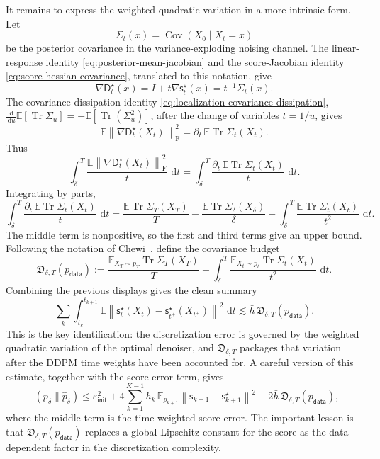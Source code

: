 \documentclass[10pt,a4paper]{amsart}
\numberwithin{equation}{section}
\DeclareMathOperator{\KL}{D_{\mathsf{KL}}}
\DeclareMathOperator{\Cov}{Cov}
\DeclareMathOperator{\Tr}{Tr}
\newcommand{\E}{\mathbb{E}}
\newcommand{\dd}{\,\mathrm{d}}
\newcommand{\Id}{I}
\newcommand{\wh}[1]{\widehat{#1}}
\newcommand{\norm}[1]{\left\lVert #1 \right\rVert}
\newcommand{\pdata}{p_{\mathsf{data}}}
\newcommand{\sstar}{\mathsf{s}^{\star}}
\newcommand{\score}{\mathsf{s}}
\newcommand{\dstar}{\mathsf{D}^{\star}}
\newcommand{\epsinit}{\varepsilon_{\mathsf{init}}}
\begin{document}
It remains to express the weighted quadratic variation in a more intrinsic
form.  Let
\[
    \Sigma_t(x)=\Cov(X_0\mid X_t=x)
\]
be the posterior covariance in the variance-exploding noising channel.  The
linear-response identity \eqref{eq:posterior-mean-jacobian} and the
score-Jacobian identity \eqref{eq:score-hessian-covariance}, translated to this
notation, give
\[
    \nabla \dstar_t(x)
    =
    \Id+t\nabla\sstar_t(x)
    =
    t^{-1}\Sigma_t(x).
\]
The covariance-dissipation identity
\eqref{eq:localization-covariance-dissipation},
$\frac{\dd}{\dd u}\E[\Tr\Sigma_u] = -\E[\Tr(\Sigma_u^2)]$, after the change of
variables $t=1/u$, gives
\[
    \E\norm{\nabla \dstar_t(X_t)}_{\mathrm F}^2
    =
    \partial_t\,\E\Tr\Sigma_t(X_t).
\]
Thus
\[
    \int_\delta^T
    \frac{\E\norm{\nabla \dstar_t(X_t)}_{\mathrm F}^2}{t}
    \,\dd t
    =
    \int_\delta^T
    \frac{\partial_t\,\E\Tr\Sigma_t(X_t)}{t}\,\dd t.
\]
Integrating by parts,
\[
    \int_\delta^T
    \frac{\partial_t\,\E\Tr\Sigma_t(X_t)}{t}\,\dd t
    =
    \frac{\E\Tr\Sigma_T(X_T)}{T}
    -
    \frac{\E\Tr\Sigma_\delta(X_\delta)}{\delta}
    +
    \int_\delta^T
    \frac{\E\Tr\Sigma_t(X_t)}{t^2}\,\dd t.
\]
The middle term is nonpositive, so the first and third terms give an upper
bound.  Following the notation of
Chewi~\cite[Chapter~12]{chewi2024logconcave}, define the covariance budget
\begin{equation}\label{eq:D-delta-T}
    \mathfrak D_{\delta,T}(\pdata)
    :=
    \frac{\E_{X_T\sim p_T}\Tr\Sigma_T(X_T)}{T}
    +
    \int_\delta^T
    \frac{\E_{X_t\sim p_t}\Tr\Sigma_t(X_t)}{t^2}\,\dd t.
\end{equation}
Combining the previous displays gives the clean summary
\[
    \sum_k
    \int_{t_k}^{t_{k+1}}
    \E\norm{
        \sstar_t(X_t)-\sstar_{t^+}(X_{t^+})
    }^2\,\dd t
    \lesssim
    \bar h\,\mathfrak D_{\delta,T}(\pdata).
\]
This is the key identification: the discretization error is governed by the
weighted quadratic variation of the optimal denoiser, and
$\mathfrak D_{\delta,T}$ packages that variation after the DDPM time weights
have been accounted for.  A careful version of this estimate, together with the
score-error term, gives
\begin{equation}\label{eq:chewi-ddpm-D}
    \KL(p_\delta\|\wh p_\delta)
    \leq
    \epsinit^2
    +
    4\sum_{k=1}^{K-1} h_k\,
    \E_{p_{k+1}}
    \norm{\score_{k+1}-\sstar_{k+1}}^2
    +
    2\bar h\,\mathfrak D_{\delta,T}(\pdata),
\end{equation}
where the middle term is the time-weighted score error.
The important lesson is that $\mathfrak D_{\delta,T}(\pdata)$ replaces a global
Lipschitz constant for the score as the data-dependent factor in the
discretization complexity.
\end{document}
